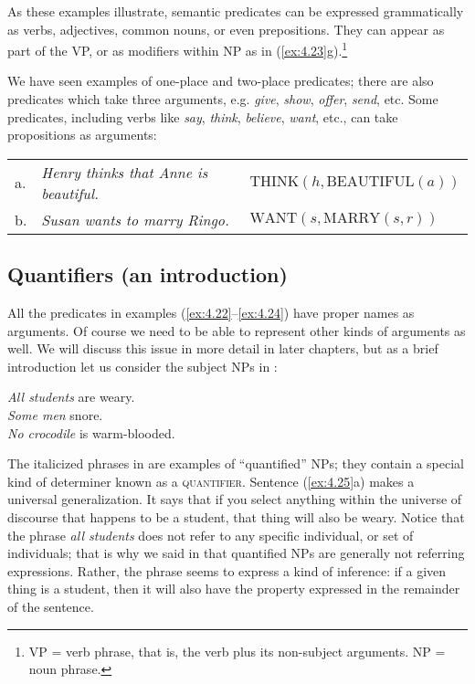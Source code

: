 As these examples illustrate, semantic predicates can be expressed grammatically as verbs, adjectives, common nouns, or even prepositions. They can appear as part of the VP, or as modifiers within NP as in (\ref{ex:4.23}g).\footnote{VP = verb phrase, that is, the verb plus its non-subject arguments. NP = noun phrase.}



We have seen examples of one-place and two-place predicates; there are also predicates which take three arguments, e.g. \textit{give}, \textit{show}, \textit{offer}, \textit{send}, etc. Some predicates, including verbs like \textit{say}, \textit{think}, \textit{believe}, \textit{want}, etc., can take propositions as arguments:


\ea \label{ex:4.24}
\begin{tabular}[t]{lll}
a. & \textit{Henry thinks that Anne is beautiful.}  & $\text{THINK}(h, \text{BEAUTIFUL}(a))$\\
b. & \textit{Susan wants to marry Ringo.} & $\text{WANT}(s, \text{MARRY}(s,r))$
\end{tabular}
\z

\subsection{Quantifiers (an introduction)}\label{sec:4.4.1}
\begin{sloppypar}
All the predicates in examples (\ref{ex:4.22}--\ref{ex:4.24}) have proper names as arguments. Of course we need to be able to represent other kinds of arguments as well. We will discuss this issue in more detail in later chapters, but as a brief introduction let us consider the subject NPs in :
\end{sloppypar}

\ea \label{ex:4.25}
\ea \textit{All students} are weary.\\
\ex \textit{Some men} snore.\\
\ex \textit{No crocodile} is warm-blooded.
    \z
\z

The italicized phrases in  are examples of “quantified” NPs; they contain a special kind of determiner known as a \textsc{quantifier}. Sentence (\ref{ex:4.25}a) makes a universal generalization. It says that if you select anything within the universe of discourse that happens to be a student, that thing will also be weary. Notice that the phrase \textit{all students} does not refer to any specific individual, or set of individuals; that is why we said in  that quantified NPs are generally not referring expressions. Rather, the phrase seems to express a kind of inference: if a given thing is a student, then it will also have the property expressed in the remainder of the sentence.


